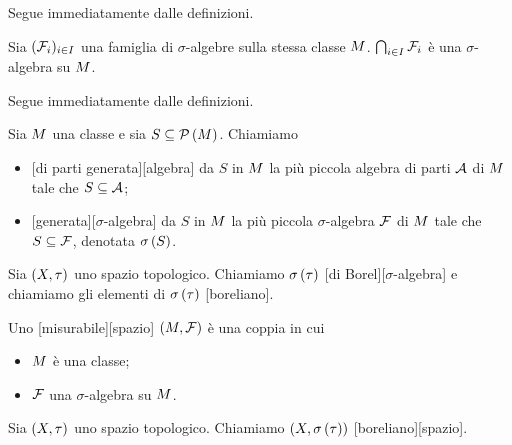\Proof Segue immediatamente dalle definizioni. \EndProof
\begin{Corollary}
  Sia $(\mathcal{F}_i)_{i \in I}$ una famiglia di $\sigma$-algebre sulla
  stessa classe $M$.
  $\bigcap_{i \in I} \mathcal{F}_i$ \`e una $\sigma$-algebra su
  $M$.
\end{Corollary}
\Proof Segue immediatamente dalle definizioni. \EndProof
\begin{Definition}
  Sia $M$ una classe e sia $S \subseteq \mathcal{P} \left (M \right )$.
  Chiamiamo
  \begin{itemize}
    \item {}[di parti generata][algebra]
      da $S$ in $M$ la pi\`u piccola algebra di parti
      $\mathcal{A}$ di $M$ tale che
      $S \subseteq \mathcal{A}$;
    \item {}[generata][$\sigma$-algebra]
      da $S$ in $M$ la pi\`u piccola $\sigma$-algebra
      $\mathcal{F}$ di $M$ tale che
      $S \subseteq \mathcal{F}$, denotata
      $\sigma \left ( S \right )$.
  \end{itemize}
\end{Definition}
\begin{Definition}
  Sia $(X,\tau)$ uno spazio topologico. Chiamiamo
  $\sigma \left ( \tau \right )$
  [di Borel][$\sigma$-algebra]
  e chiamiamo gli elementi di
  $\sigma \left ( \tau \right )$
  [boreliano].
\end{Definition}
\begin{Definition}
	Uno [misurabile][spazio]
  $(M,\mathcal{F})$
  \`e una coppia in cui
  \begin{itemize}
    \item $M$ \`e una classe;
    \item $\mathcal{F}$ una $\sigma$-algebra su $M$.
  \end{itemize}
\end{Definition}
\begin{Definition}
  Sia $(X,\tau)$ uno spazio topologico. Chiamiamo
  $(X,\sigma \left ( \tau \right ))$
  [boreliano][spazio].
\end{Definition}
